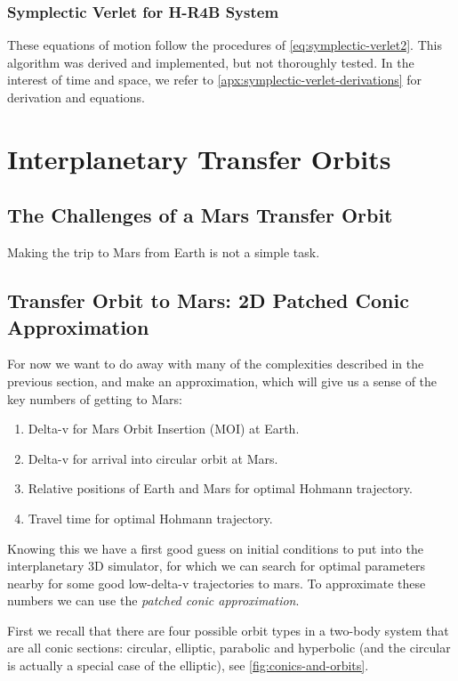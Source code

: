 \subsubsection{Symplectic Verlet for H-R4B System}

These equations of motion follow the procedures of \cref{eq:symplectic-verlet2}. This algorithm was derived and implemented, but not thoroughly tested. In the interest of time and space, we refer to \cref{apx:symplectic-verlet-derivations} for derivation and equations.

\section{Interplanetary Transfer Orbits}


\subsection{The Challenges of a Mars Transfer Orbit}
Making the trip to Mars from Earth is not a simple task. 

\subsection{Transfer Orbit to Mars: 2D Patched Conic Approximation} \label{sec:2d-patched-conic}
For now we want to do away with many of the complexities described in the previous section, and make an approximation, which will give us a sense of the key numbers of getting to Mars:
\begin{enumerate}
	\item Delta-v for Mars Orbit Insertion (MOI) at Earth.
	\item Delta-v for arrival into circular orbit at Mars.
	\item Relative positions of Earth and Mars for optimal Hohmann trajectory.
	\item Travel time for optimal Hohmann trajectory.
\end{enumerate}

Knowing this we have a first good guess on initial conditions to put into the interplanetary 3D simulator, for which we can search for optimal parameters nearby for some good low-delta-v trajectories to mars. To approximate these numbers we can use the \emph{patched conic approximation}.

First we recall that there are four possible orbit types in a two-body system that are all conic sections: circular, elliptic, parabolic and hyperbolic (and the circular is actually a special case of the elliptic), see \cref{fig:conics-and-orbits}.

